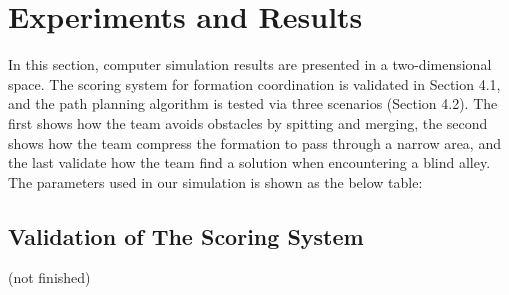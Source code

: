 \chapter{Experiments and Results}
In this section, computer simulation results are presented in a two-dimensional space. The scoring system for formation coordination is validated in Section 4.1, and the path planning algorithm is tested via three scenarios (Section 4.2). The first shows how the team avoids obstacles by spitting and merging, the second shows how the team compress the formation to pass through a narrow area, and the last validate how the team find a solution when encountering a blind alley. The parameters used in our simulation is shown as the below table:


\begin{center}
\label{table:combination}
\end{center}


\section{Validation of The Scoring System}
(not finished)

